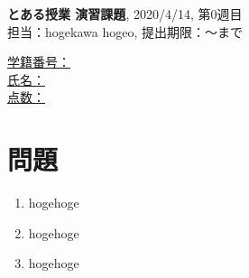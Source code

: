 \documentclass[uplatex, 11pt]{jsarticle}
\newcommand{\reportcount}{0}
\newcommand{\classdate}{2020/4/14}
\newcommand{\deadline}{〜まで}
\begin{document}
\begin{center}
    \textbf{とある授業 演習課題}, \classdate, 第\reportcount 週目 \\
    担当：hogekawa hogeo, 提出期限：\deadline
\end{center}

\underline{
    学籍番号：\hspace{3.0cm} \\
    氏名：\hspace{4.5cm} \\
    点数：\hspace{1.0cm} \\
}

\def\labelenumi{(\theenumi)}
\renewcommand{\thesection}{問題\arabic{section}}

\section*{問題}
\begin{enumerate}
    \item hogehoge
    \item hogehoge
    \item hogehoge

\end{enumerate}
\end{document}
